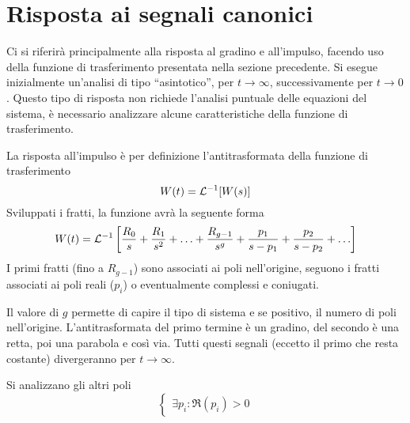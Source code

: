 
\section{Risposta ai segnali canonici}
Ci si riferirà principalmente alla risposta al gradino e all'impulso, facendo
uso della funzione di trasferimento presentata nella sezione precedente.
Si esegue inizialmente un'analisi di tipo ``asintotico'', per $t\to \infty$,
successivamente per $t\to 0$. Questo tipo di risposta non richiede l'analisi
puntuale delle equazioni del sistema, è necessario analizzare alcune
caratteristiche della funzione di trasferimento.

La risposta all'impulso è per definizione l'antitrasformata della funzione di
trasferimento
$$
W(t) = \mathcal{L}^{-1} [W(s)]
$$
Sviluppati i fratti, la funzione avrà la seguente forma
$$
W(t) = \mathcal{L}^{-1}\left[\frac{R_0}{s} + \frac{R_1}{s^2} +\ldots +
\frac{R_{g-1}}{s^g} + \frac{p_1}{s-p_1} + \frac{p_2}{s-p_2} + \ldots \right]
$$
I primi fratti (fino a $R_{g-1}$) sono associati ai poli nell'origine, seguono
i fratti associati ai poli reali ($p_i$) o eventualmente complessi e coniugati.

Il valore di $g$ permette di capire il tipo di sistema e se positivo, il numero
di poli nell'origine.
L'antitrasformata del primo termine è un gradino, del secondo è una retta, poi
una parabola e così via.
Tutti questi segnali (eccetto il primo che resta costante) divergeranno per
$t\to \infty$.

Si analizzano gli altri poli
$$\left\{
\begin{aligned}
\exists p_i : \Re(p_i) > 0
\end{aligned}\right.
$$
